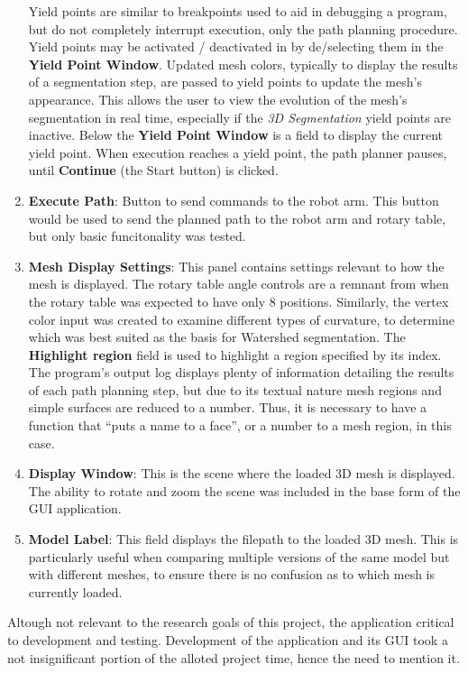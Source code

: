 \begin{enumerate}
		Yield points are similar to breakpoints used to aid in debugging a program, but do not completely interrupt execution, only the path planning procedure.
		Yield points may be activated / deactivated in by de/selecting them in the \textbf{Yield Point Window}.
		Updated mesh colors, typically to display the results of a segmentation step, are passed to yield points to update the mesh's appearance.
		This allows the user to view the evolution of the mesh's segmentation in real time, especially if the \textit{3D Segmentation} yield points are inactive.
		Below the \textbf{Yield Point Window} is a field to display the current yield point.
		When execution reaches a yield point, the path planner pauses, until \textbf{Continue} (the Start button) is clicked.
	\item \textbf{Execute Path}: Button to send commands to the robot arm.
		This button would be used to send the planned path to the robot arm and rotary table, but only basic funcitonality was tested.
	\item \textbf{Mesh Display Settings}: This panel contains settings relevant to how the mesh is displayed.
		The rotary table angle controls are a remnant from when the rotary table was expected to have only 8 positions.
		Similarly, the vertex color input was created to examine different types of curvature, to determine which was best suited as the basis for Watershed segmentation.
		The \textbf{Highlight region} field is used to highlight a region specified by its index.
		The program's output log displays plenty of information detailing the results of each path planning step, but due to its textual nature mesh regions and simple surfaces are reduced to a number.
		Thus, it is necessary to have a function that ``puts a name to a face'', or a number to a mesh region, in this case.
	\item \textbf{Display Window}: This is the scene where the loaded 3D mesh is displayed.
		The ability to rotate and zoom the scene was included in the base form of the GUI application.
	\item \textbf{Model Label}: This field displays the filepath to the loaded 3D mesh.
		This is particularly useful when comparing multiple versions of the same model but with different meshes, to ensure there is no confusion as to which mesh is currently loaded.
\end{enumerate}

Altough not relevant to the research goals of this project, the application critical to development and testing.
Development of the application and its GUI took a not insignificant portion of the alloted project time, hence the need to mention it.

